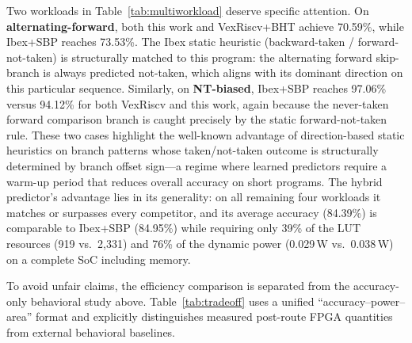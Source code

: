 \documentclass[12pt,a4paper]{article}
\begin{document}
Two workloads in Table~\ref{tab:multiworkload} deserve specific attention.
On \textbf{alternating-forward}, both this work and VexRiscv+BHT achieve
70.59\%, while Ibex+SBP reaches 73.53\%.
The Ibex static heuristic (backward-taken / forward-not-taken) is
structurally matched to this program: the alternating forward skip-branch
is always predicted not-taken, which aligns with its dominant direction on
this particular sequence.
Similarly, on \textbf{NT-biased}, Ibex+SBP reaches 97.06\% versus 94.12\%
for both VexRiscv and this work, again because the never-taken forward
comparison branch is caught precisely by the static forward-not-taken rule.
These two cases highlight the well-known advantage of direction-based static
heuristics on branch patterns whose taken/not-taken outcome is structurally
determined by branch offset sign---a regime where learned predictors
require a warm-up period that reduces overall accuracy on short programs.
The hybrid predictor's advantage lies in its generality: on all remaining
four workloads it matches or surpasses every competitor, and its average
accuracy (84.39\%) is comparable to Ibex+SBP (84.95\%) while requiring
only 39\% of the LUT resources (919 vs.\ 2{,}331) and 76\% of the
dynamic power (0.029\,W vs.\ 0.038\,W) on a complete SoC including memory.

To avoid unfair claims, the efficiency comparison is separated from the
accuracy-only behavioral study above. Table~\ref{tab:tradeoff} uses a unified
``accuracy--power--area'' format and explicitly distinguishes measured
post-route FPGA quantities from external behavioral baselines.
\end{document}
